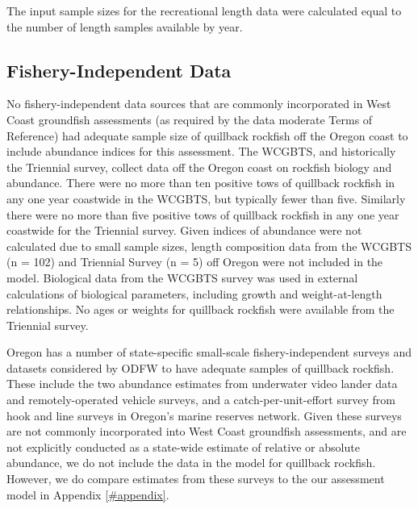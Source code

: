 \documentclass[11pt,
  english,
  a4paper,
]{article}
\begin{document}
\leavevmode\tagmcend\tagstructend\par


The input sample sizes for the recreational length data were calculated equal to the number of length samples available by year.

\leavevmode\tagmcend\tagstructend\par


\hypertarget{fishery-independent-data}{%
\subsection{Fishery-Independent Data}\label{fishery-independent-data}}

\leavevmode\tagmcend\tagstructend


No fishery-independent data sources that are commonly incorporated in West Coast groundfish assessments (as required by the data moderate Terms of Reference) had adequate sample size of quillback rockfish off the Oregon coast to include abundance indices for this assessment. The WCGBTS, and historically the Triennial survey, collect data off the Oregon coast on rockfish biology and abundance. There were no more than ten positive tows of quillback rockfish in any one year coastwide in the WCGBTS, but typically fewer than five. Similarly there were no more than five positive tows of quillback rockfish in any one year coastwide for the Triennial survey. Given indices of abundance were not calculated due to small sample sizes, length composition data from the WCGBTS (n = 102) and Triennial Survey (n = 5) off Oregon were not included in the model. Biological data from the WCGBTS survey was used in external calculations of biological parameters, including growth and weight-at-length relationships. No ages or weights for quillback rockfish were available from the Triennial survey.

\leavevmode\tagmcend\tagstructend\par


Oregon has a number of state-specific small-scale fishery-independent surveys and datasets considered by ODFW to have adequate samples of quillback rockfish. These include the two abundance estimates from underwater video lander data and remotely-operated vehicle surveys, and a catch-per-unit-effort survey from hook and line surveys in Oregon's marine reserves network. Given these surveys are not commonly incorporated into West Coast groundfish assessments, and are not explicitly conducted as a state-wide estimate of relative or absolute abundance, we do not include the data in the model for quillback rockfish. However, we do compare estimates from these surveys to the our assessment model in Appendix \ref{#appendix}.
\end{document}
